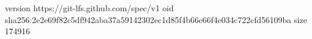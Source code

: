 version https://git-lfs.github.com/spec/v1
oid sha256:2e2e69f82c5df942aba37a59142302ec1d85f4b66e66f4e034c722cfd56109ba
size 174916
